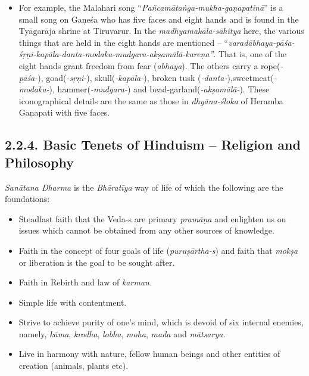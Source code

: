 \begin{itemize}

 \item For example, the Malahari song “\textit{Pañcamātaṅga-mukha-gaṇapa\-tinā}” is a small song on Gaṇeśa who has five faces and eight hands and is found in the Tyāgarāja shrine at Tiruvarur. In the \textit{madhyamakāla-sāhitya} here, the various things that are held in the eight hands are mentioned – “\textit{varadābhaya-pāśa-śṛṇi-kapāla-danta-modaka-mudgara-akṣamālā-kareṇa”}. That is, one of the eight hands grant freedom from fear (\textit{abhaya}). The others carry a rope(\textit{-pāśa-}), goad(\textit{-sṛṇi-}), skull(\textit{-kapāla-}), broken tusk (\textit{-danta-}),\break sweetmeat(\textit{-modaka-}), hammer(\textit{-mudgara-}) and bead-garland\break (\textit{-akṣamālā-}). These iconographical details are the same as those in \textit{dhyāna-śloka} of Heramba Gaṇapati with five faces.
\end{itemize}


\subsection*{2.2.4. Basic Tenets of Hinduism – Religion and Philosophy}

\textit{Sanātana Dharma} is the \textit{Bhāratīya} way of life of which the following are the foundations:

\vspace{-.4cm}

\begin{itemize}
\itemsep=0pt

 \item Steadfast faith that the Veda-s are primary \textit{pramāṇa} and enlighten us on issues which cannot be obtained from any other sources of knowledge.

 \item Faith in the concept of four goals of life (\textit{puruṣārtha-s}) and faith that \textit{mokṣa} or liberation is the goal to be sought after.

 \item Faith in Rebirth and law of \textit{karman.}

 \item Simple life with contentment.

 \item Strive to achieve purity of one’s mind, which is devoid of six internal enemies, namely, \textit{kāma}, \textit{krodha}, \textit{lobha}, \textit{moha}, \textit{mada} and \textit{mātsarya.}

 \item Live in harmony with nature, fellow human beings and other entities of creation (animals, plants etc).

\end{itemize}

